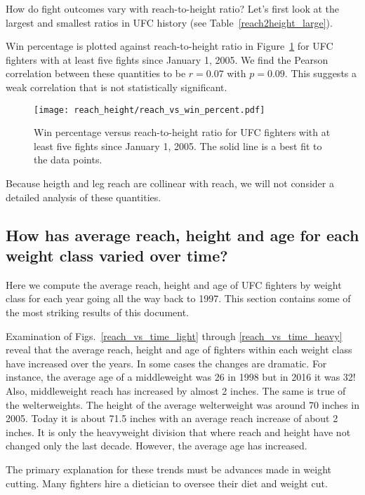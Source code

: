 How do fight outcomes vary with reach-to-height ratio? Let's first look
at the largest and smallest ratios in UFC history (see
Table~\ref{reach2height_large}).

\clearpage

Win percentage is plotted against reach-to-height ratio in
Figure~\ref{reach_vs_win_percent} for UFC
fighters with at least five fights since January 1, 2005.
We find the Pearson correlation between these quantities
to be $r=0.07$ with $p=0.09$. This suggests
a weak correlation that is not statistically significant.

\begin{figure}[h]
\begin{center}
\texttt{[image: reach\_height/reach\_vs\_win\_percent.pdf]}
\caption{Win percentage versus reach-to-height ratio for UFC
fighters with at least five fights since January 1, 2005. The solid line
is a best fit to the data points.}
\label{reach_vs_win_percent}
\end{center}
\end{figure}

Because heigth and leg reach are collinear with reach, we will not
consider a detailed analysis of these quantities.

\clearpage
\subsection*{How has average reach, height and age for each weight class varied over time?}

Here we compute the average reach, height and age of UFC fighters
by weight class
for each year going all the way back to 1997. This section
contains some of the most striking results of this document.

Examination of Figs.~\ref{reach_vs_time_light} through
\ref{reach_vs_time_heavy} reveal that the average reach,
height and age of fighters within each weight class
have increased over the years. In some cases the changes
are dramatic.
For instance, the average age of a middleweight was
26 in 1998 but in 2016 it was 32! Also, middleweight reach
has increased by almost 2 inches. The same is true of
the welterweights.
The height of the average welterweight was around 70 inches in 2005.
Today it is about 71.5 inches with an average reach increase of
about 2 inches. It is only the heavyweight division that where
reach and height have not changed only the last decade. However,
the average age has increased.

The primary explanation for these trends must be advances made in
weight cutting. Many fighters hire a dietician to oversee their
diet and weight cut.

